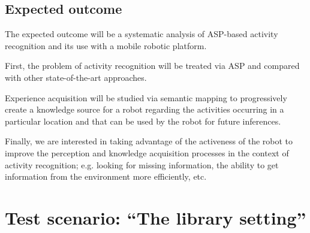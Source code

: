 \subsection{Expected outcome}

The expected outcome will be a systematic analysis of ASP-based activity recognition and its use with a mobile robotic platform.

First, the problem of activity recognition will be treated via ASP and compared with other state-of-the-art approaches.

Experience acquisition will be studied via semantic mapping to progressively create a knowledge source for a robot regarding the activities occurring in a particular location and that can be used by the robot for future inferences.

Finally, we are interested in taking advantage of the activeness of the robot to improve the perception and knowledge acquisition processes in the context of activity recognition; e.g. looking for missing information, the ability to get information from the environment more efficiently, etc.







\section{Test scenario: ``The library setting''} \label{sec_Library} %

